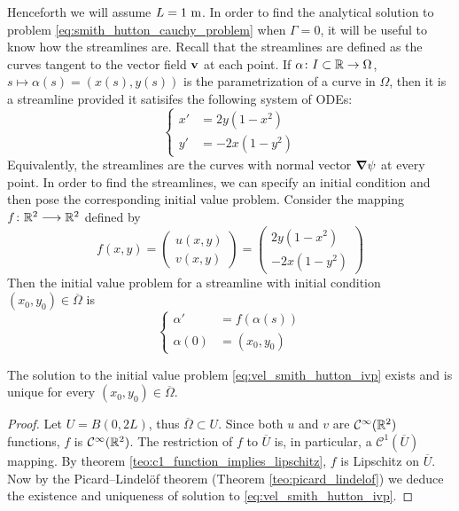 Henceforth we will assume $L = 1 \ \meter$. In order to find the analytical
solution to problem \eqref{eq:smith_hutton_cauchy_problem} when $\Gamma = 0$, it
will be useful to know how the streamlines are. Recall that the streamlines are
defined as the curves tangent to the vector field $\vb{v}$ at each point. If
$\alpha \colon I \subset \mathbb{R} \to \Omega$, $s \mapsto \alpha(s) = (x(s), y(s))$
is the parametrization of a curve in $\Omega$, then it is a streamline provided
it satisifes the following system of ODEs:
\begin{equation} \label{eq:velocity_smith_hutton_odes}
	\left\{
	\begin{aligned}
		x' &= 2 y (1 - x^2) \\
		y' &= - 2 x (1 - y^2)
	\end{aligned}
	\right.
\end{equation}
Equivalently, the streamlines are the curves with normal vector $\grad{\psi}$ at
every point. In order to find the streamlines, we can specify an initial
condition and then pose the corresponding initial value problem. Consider the
mapping $f \colon \mathbb{R}^2 \longrightarrow \mathbb{R}^2$ defined by
\begin{equation} \label{eq:smith_hutton_velocity_mapping}
	f(x,y) = 
	\begin{pmatrix}
		u(x,y) \\ v(x,y)
	\end{pmatrix} =
	\begin{pmatrix}
		2 y (1 - x^2) \\ - 2 x (1 - y^2)
	\end{pmatrix}
\end{equation}
Then the initial value problem for a streamline with initial condition $(x_0,y_0) \in \overline{\Omega}$ is
\begin{equation} \label{eq:vel_smith_hutton_ivp}
	\left\{
		\begin{aligned}
			\alpha' &= f(\alpha(s)) \\
			\alpha(0) &= (x_0, y_0)
		\end{aligned}
	\right.
\end{equation}

\begin{prop} \label{prop:existence_uniqueness_streamlines}
	The solution to the initial value problem \eqref{eq:vel_smith_hutton_ivp}
	exists and is unique for every $(x_0, y_0) \in \overline{\Omega}$.
\end{prop}
\begin{proof}
	Let $U = B(0,2L)$, thus $\overline{\Omega} \subset U$. Since both $u$ and
	$v$ are $\mathcal{C}^\infty(\mathbb{R}^2)$ functions, $f$ is
	$\mathcal{C}^\infty(\mathbb{R}^2)$. The restriction of $f$ to $\overline{U}$ is,
	in particular, a $\mathcal{C}^1(\overline{U})$ mapping. By theorem
	\ref{teo:c1_function_implies_lipschitz}, $f$ is Lipschitz on $\overline{U}$.
	Now by the Picard--Lindelöf theorem (Theorem \ref{teo:picard_lindelof}) we
	deduce the existence and uniqueness of solution to
	\eqref{eq:vel_smith_hutton_ivp}.
\end{proof}

